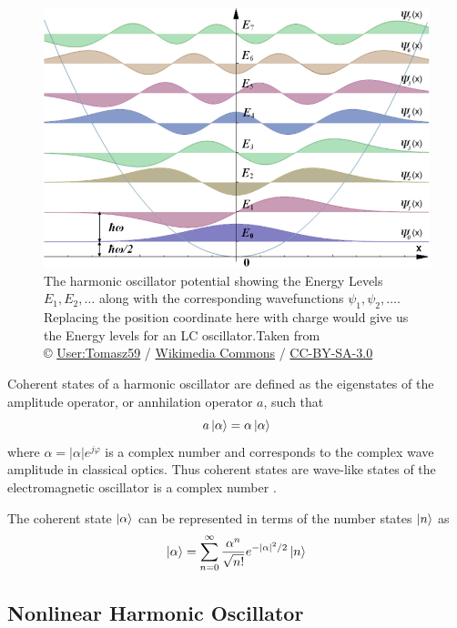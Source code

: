 \begin{figure}
\centering
\includegraphics[width=\linewidth]{Figures/harmonic_oscillator}
\decoRule
\caption[Harmonic Oscillator Energy Levels]{The harmonic oscillator potential showing the Energy Levels $E_1,E_2,\ldots$ along with the corresponding wavefunctions $\psi_1,\psi_2,\ldots$. Replacing the position coordinate here with charge would give us the Energy levels for an LC oscillator.Taken from \\© \href{https://pl.wikipedia.org/wiki/Wikipedysta:Tomasz59}{User:Tomasz59} / \href{http://commons.wikimedia.org/}{Wikimedia Commons} / \href{http://creativecommons.org/licenses/by-sa/3.0/}{CC-BY-SA-3.0}}
\label{fig:harmonic oscillator}
\end{figure}

Coherent states of a harmonic oscillator are defined as the eigenstates of the amplitude operator, or annhilation operator $a$, such that
\begin{equation}
a\ket{\alpha} = \alpha\ket{\alpha}
\end{equation}
where $\alpha = |\alpha|e^{j\varphi}$ is a complex number and corresponds to the complex wave amplitude in classical optics. Thus coherent states are wave-like states of the electromagnetic oscillator is a complex number \cite{Glauber1963}.

The coherent state $\ket{\alpha}$ can be represented in terms of the number states $\ket{n}$ as
\begin{equation}
\ket{\alpha} = \sum_{n=0}^\infty \frac{\alpha^n}{\sqrt{n!}}e^{-|\alpha|^2/2}\ket{n}
\label{eqn:glauber expansion}
\end{equation}

\subsection{Nonlinear Harmonic Oscillator}

